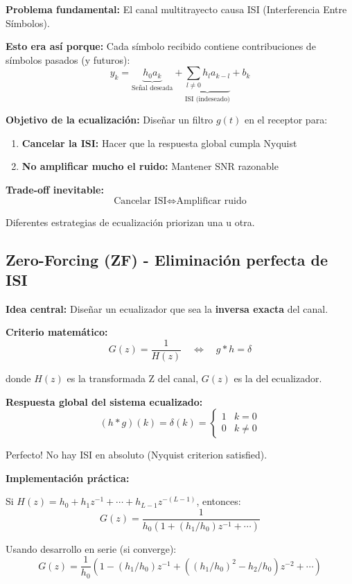 \documentclass[10pt,a4paper]{article}
\begin{document}
\begin{tcolorbox}[colback=rojoclaro!10,colframe=rojoclaro,title=🧠 MOTIVACIÓN PROFUNDA]
\textbf{Problema fundamental:} El canal multitrayecto causa ISI (Interferencia Entre Símbolos).

\textbf{Esto era así porque:} Cada símbolo recibido contiene contribuciones de símbolos pasados (y futuros):
$$y_k = \underbrace{h_0 a_k}_{\text{Señal deseada}} + \underbrace{\sum_{l\neq 0} h_l a_{k-l}}_{\text{ISI (indeseado)}} + b_k$$

\textbf{Objetivo de la ecualización:} Diseñar un filtro $g(t)$ en el receptor para:
\begin{enumerate}
\item \textbf{Cancelar la ISI:} Hacer que la respuesta global cumpla Nyquist
\item \textbf{No amplificar mucho el ruido:} Mantener SNR razonable
\end{enumerate}

\textbf{Trade-off inevitable:}
$$\text{Cancelar ISI} \Leftrightarrow \text{Amplificar ruido}$$

Diferentes estrategias de ecualización priorizan una u otra.
\end{tcolorbox}

\subsection{Zero-Forcing (ZF) - Eliminación perfecta de ISI}

\textbf{Idea central:} Diseñar un ecualizador que sea la \textbf{inversa exacta} del canal.

\textbf{Criterio matemático:}
$$G(z) = \frac{1}{H(z)} \quad \Leftrightarrow \quad g * h = \delta$$

donde $H(z)$ es la transformada Z del canal, $G(z)$ es la del ecualizador.

\textbf{Respuesta global del sistema ecualizado:}
$$(h * g)(k) = \delta(k) = \begin{cases} 1 & k=0\\ 0 & k \neq 0 \end{cases}$$

Perfecto! No hay ISI en absoluto (Nyquist criterion satisfied).

\textbf{Implementación práctica:}

Si $H(z) = h_0 + h_1 z^{-1} + \cdots + h_{L-1}z^{-(L-1)}$, entonces:
$$G(z) = \frac{1}{h_0(1 + (h_1/h_0)z^{-1} + \cdots)}$$

Usando desarrollo en serie (si converge):
$$G(z) = \frac{1}{h_0}(1 - (h_1/h_0)z^{-1} + ((h_1/h_0)^2 - h_2/h_0)z^{-2} + \cdots)$$
\end{document}
